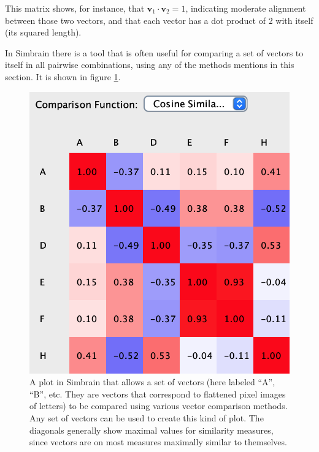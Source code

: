 This matrix shows, for instance, that \( \mathbf{v}_1 \cdot \mathbf{v}_2 = 1 \), indicating 
moderate alignment between those two vectors, and that each vector has a dot product of 2 
with itself (its squared length).

In Simbrain there is a tool that is often useful for comparing a set of vectors to itself in all pairwise combinations, using any of the  methods mentions in this section. It is shown in figure \ref{corrPlot}.

\begin{figure}[h]
\centering
\includegraphics[scale=.5]{./images/corrPlot.png}
\caption[Simbrain screenshot from Jeff Yoshimi.]{A plot in Simbrain that allows a set of vectors (here labeled ``A'', ``B'', etc. They are vectors that correspond to flattened pixel images of letters) to be compared using various vector comparison methods. Any set of vectors can be used to create this kind of plot. The diagonals generally show maximal values for similarity measures, since vectors are on most measures maximally similar to themselves. }
\label{corrPlot}
\end{figure}


